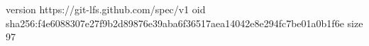 version https://git-lfs.github.com/spec/v1
oid sha256:f4e6088307e27f9b2d89876e39aba6f36517aea14042e8e294fc7be01a0b1f6e
size 97
